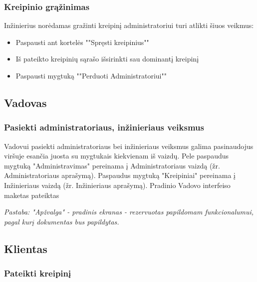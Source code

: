 	\subsubsection{Kreipinio grąžinimas}
	
	Inžinierius norėdamas gražinti kreipinį administratoriui turi atlikti šiuos veikmus:
	
	\begin{itemize}
		\item Paspausti ant kortelės ""Spręsti kreipinius"" 
		\item Iš pateikto kreipinių sąrašo išsirinkti sau dominantį kreipinį 
		\item Paspausti mygtuką ""Perduoti Administratoriui"" 
	\end{itemize}

\subsection{Vadovas}

	\subsubsection{Pasiekti administratoriaus, inžinieriaus veiksmus}
		
	
	Vadovui pasiekti administratoriaus bei inžinieriaus veiksmus galima pasinaudojus viršuje esančia juosta su mygtukais kiekvienam iš vaizdų.
	Pele paspaudus mygtuką "Administravimas" pereinama į Administratoriaus vaizdą (žr. Administratoriaus aprašymą).
	Paspaudus mygtuką "Kreipiniai" pereinama į Inžinieriaus vaizdą (žr. Inžinieriaus aprašymą).
	Pradinio Vadovo interfeiso maketas pateiktas 
	
	\textit{Pastaba: "Apžvalga" - pradinis ekranas - rezervuotas papildomam funkcionalumui, pagal kurį dokumentas bus papildytas.}
	
\subsection{Klientas}

	\subsubsection{Pateikti kreipinį}
	
